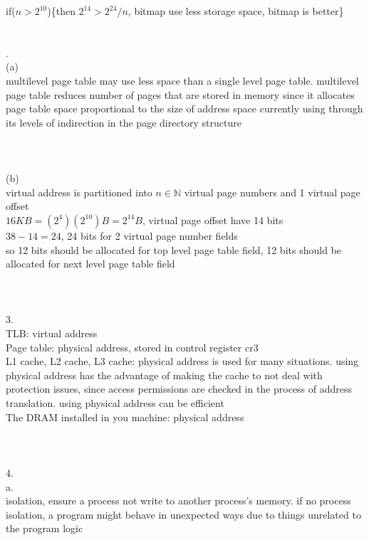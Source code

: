 \documentclass[12pt, border = 4pt, multi]{article} %
\begin{document}
if($n > 2 ^ {10}$)\{then $2 ^ {14} > 2 ^ {24} / n$, bitmap use less storage space, bitmap is better\}\\
\\
\\
\newpage
{}.\\
(a)\\
multilevel page table may use less space than a single level page table. multilevel page table reduces number of pages that are stored in memory since it allocates page table space proportional to the size of address space currently using through its levels of indirection in the page directory structure\\
\\
\\
\\
(b)\\
virtual address is partitioned into $n \in \mathbb{N}$ virtual page numbers and 1 virtual page offset\\
$16KB = (2 ^ 4)(2 ^ {10})B = 2 ^ {14}B$, virtual page offset have 14 bits\\
$38 - 14 = 24$, 24 bits for 2 virtual page number fields\\
so 12 bits should be allocated for top level page table field, 12 bits should be allocated for next level page table field\\
\\
\\
\\
3.\\
TLB: virtual address\\
Page table: physical address, stored in control register cr3\\
L1 cache, L2 cache, L3 cache: physical address is used for many situations. using physical address has the advantage of making the cache to not deal with protection issues, since access permissions are checked in the process of address translation. using physical address can be efficient\\
The DRAM installed in you machine: physical address\\
\\
\\
\\
4.\\
a.\\
isolation, ensure a process not write to another process's memory. if no process isolation, a program might behave in unexpected ways due to things unrelated to the program logic\\
\\
\end{document}
